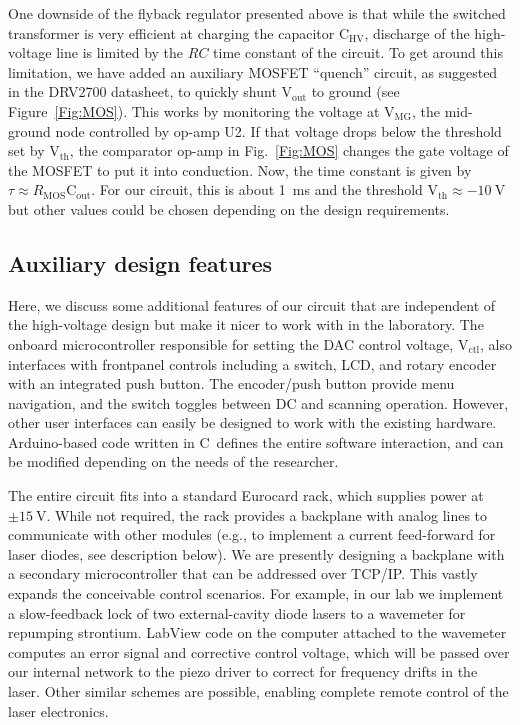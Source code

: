 \documentclass[aip,rsi,reprint]{revtex4-1} %
\newcommand{\CC}{{C\nolinebreak[4]\hspace{-.05em}\raisebox{.4ex}{\tiny\bf ++}}~}
\begin{document}
One downside of the flyback regulator presented above is that while the switched transformer is very efficient at charging the capacitor $\text{C}_\text{HV}$, discharge of the high-voltage line is limited by the $RC$ time constant of the circuit.
To get around this limitation, we have added an auxiliary MOSFET ``quench'' circuit, as suggested in the DRV2700 datasheet, to quickly shunt $\text{V}_\text{out}$ to ground (see Figure~\ref{Fig:MOS}).
This works by monitoring the voltage at $\text{V}_\text{MG}$, the mid-ground node controlled by op-amp U2.
If that voltage drops below the threshold set by $\text{V}_\text{th}$, the comparator op-amp in Fig.~\ref{Fig:MOS} changes the gate voltage of the MOSFET to put it into conduction.
Now, the time constant is given by $\tau \approx R_\text{MOS}\text{C}_\text{out}$. For our circuit, this is about \SI{1}{\milli\second} and the threshold $\text{V}_\text{th} \approx \SI{-10}{\volt}$ but other values could be chosen depending on the design requirements.

\subsection{Auxiliary design features}
\label{Sec:AuxDesign}

Here, we discuss some additional features of our circuit that are independent of the high-voltage design but make it nicer to work with in the laboratory.
The onboard microcontroller responsible for setting the DAC control voltage, $\text{V}_\text{ctl}$, also interfaces with frontpanel controls including a switch, LCD, and rotary encoder with an integrated push button.
The encoder/push button provide menu navigation, and the switch toggles between DC and scanning operation.
However, other user interfaces can easily be designed to work with the existing hardware.
Arduino-based code written in \CC defines the entire software interaction, and can be modified depending on the needs of the researcher.

The entire circuit fits into a standard Eurocard rack, which supplies power at $\pm\SI{15}{\volt}$.
While not required, the rack provides a backplane with analog lines to communicate with other modules (e.g., to implement a current feed-forward for laser diodes, see description below).
We are presently designing a backplane with a secondary microcontroller that can be addressed over TCP/IP.
This vastly expands the conceivable control scenarios. 
For example, in our lab we implement a slow-feedback lock of two external-cavity diode lasers to a wavemeter for repumping strontium.
LabView code on the computer attached to the wavemeter computes an error signal and corrective control voltage, which will be passed over our internal network to the piezo driver to correct for frequency drifts in the laser.
Other similar schemes are possible, enabling complete remote control of the laser electronics.
\end{document}
